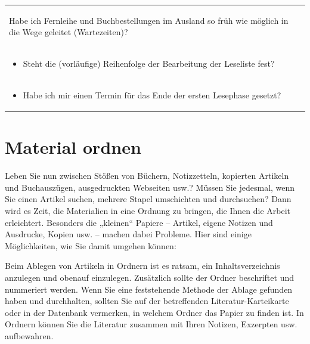 \documentclass[]{book}
\providecommand{\tightlist}{%
  \setlength{\itemsep}{0pt}\setlength{\parskip}{0pt}}
\theoremstyle{definition}
\theoremstyle{definition}
\theoremstyle{definition}
\theoremstyle{remark}
\begin{document}
\begin{longtable}[]{@{}l@{}}
\begin{minipage}[t]{0.97\columnwidth}
\begin{itemize}
  Habe ich Fernleihe und Buchbestellungen im Ausland so früh wie möglich
  in die Wege geleitet (Wartezeiten)?\vspace{-6mm}
\end{itemize}\strut
\end{minipage}\tabularnewline
\begin{minipage}[t]{0.97\columnwidth}\raggedright\strut
\begin{itemize}
\tightlist
\item
  Steht die (vorläufige) Reihenfolge der Bearbeitung der Leseliste fest?
  \vspace{-6mm}
\end{itemize}\strut
\end{minipage}\tabularnewline
\begin{minipage}[t]{0.97\columnwidth}\raggedright\strut
\begin{itemize}
\tightlist
\item
  Habe ich mir einen Termin für das Ende der ersten Lesephase gesetzt?
\end{itemize}\strut
\end{minipage}\tabularnewline
\bottomrule
\end{longtable}

\hypertarget{material-ordnen}{\section{Material
ordnen}\label{material-ordnen}}

Leben Sie nun zwischen Stößen von Büchern, Notizzetteln, kopierten
Artikeln und Buchauszügen, ausgedruckten Webseiten usw.? Müssen Sie
jedesmal, wenn Sie einen Artikel suchen, mehrere Stapel umschichten und
durchsuchen? Dann wird es Zeit, die Materialien in eine Ordnung zu
bringen, die Ihnen die Arbeit erleichtert. Besonders die „kleinen``
Papiere -- Artikel, eigene Notizen und Ausdrucke, Kopien usw. -- machen
dabei Probleme. Hier sind einige Möglichkeiten, wie Sie damit umgehen
können:

Beim Ablegen von Artikeln in Ordnern ist es ratsam, ein
Inhaltsverzeichnis anzulegen und obenauf einzulegen. Zusätzlich sollte
der Ordner beschriftet und nummeriert werden. Wenn Sie eine feststehende
Methode der Ablage gefunden haben und durchhalten, sollten Sie auf der
betreffenden Literatur-Karteikarte oder in der Datenbank vermerken, in
welchem Ordner das Papier zu finden ist. In Ordnern können Sie die
Literatur zusammen mit Ihren Notizen, Exzerpten usw. aufbewahren.
\end{document}
